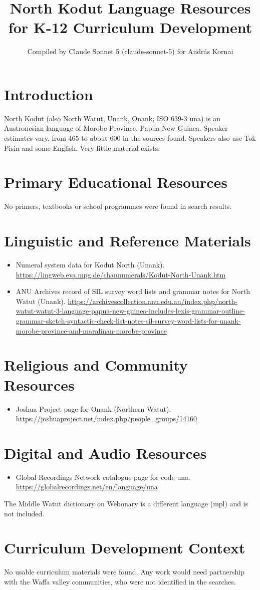 \documentclass[12pt]{article}
\title{North Kodut Language Resources for K-12 Curriculum Development}
\author{Compiled by Claude Sonnet 5 (claude-sonnet-5) for Andr\'as Kornai}
\date{}
\begin{document}
\maketitle
\section{Introduction}
North Kodut (also North Watut, Unank, Onank; ISO 639-3 una) is an Austronesian language of Morobe Province, Papua New Guinea. Speaker estimates vary, from 465 to about 600 in the sources found. Speakers also use Tok Pisin and some English. Very little material exists.
\section{Primary Educational Resources}
No primers, textbooks or school programmes were found in search results.
\section{Linguistic and Reference Materials}
\begin{itemize}
\item Numeral system data for Kodut North (Unank). \url{https://lingweb.eva.mpg.de/channumerals/Kodut-North-Unank.htm}
\item ANU Archives record of SIL survey word lists and grammar notes for North Watut (Unank). \url{https://archivescollection.anu.edu.au/index.php/north-watut-watut-3-language-papua-new-guinea-includes-lexis-grammar-outline-grammar-sketch-syntactic-check-list-notes-sil-survey-word-lists-for-unank-morobe-province-and-maralinan-morobe-province}
\end{itemize}
\section{Religious and Community Resources}
\begin{itemize}
\item Joshua Project page for Onank (Northern Watut). \url{https://joshuaproject.net/index.php/people_groups/14160}
\end{itemize}
\section{Digital and Audio Resources}
\begin{itemize}
\item Global Recordings Network catalogue page for code una. \url{https://globalrecordings.net/en/language/una}
\end{itemize}
The Middle Watut dictionary on Webonary is a different language (mpl) and is not included.
\section{Curriculum Development Context}
No usable curriculum materials were found. Any work would need partnership with the Waffa valley communities, who were not identified in the searches.
\end{document}
